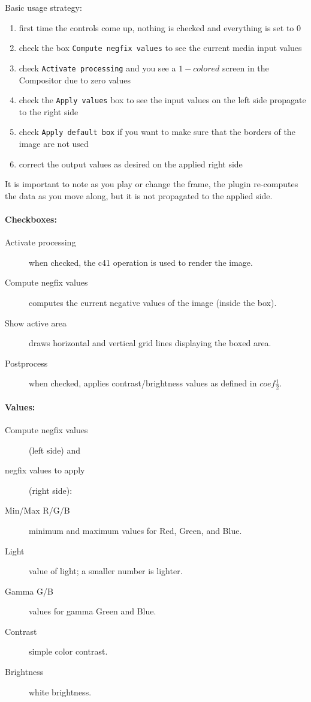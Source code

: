 Basic usage strategy:
\begin{enumerate}
    \item first time the controls come up, nothing is checked and everything is set to $0$
    \item check the box \texttt{Compute negfix values} to see the current media input values
    \item check \texttt{Activate processing} and you see a $1-colored$ screen in the Compositor due to zero values
    \item check the \texttt{Apply values} box to see the input values on the left side propagate to the right side
    \item check \texttt{Apply default box} if you want to make sure that the borders of the image are not used
    \item correct the output values as desired on the applied right side
\end{enumerate}

It is important to note as you play or change the frame, the plugin re-computes the data as you move along, but it is not propagated to the applied side.


\paragraph{Checkboxes:}
    \begin{description}
        \item[Activate processing] when checked, the c41 operation is used to render the image.
        \item[Compute negfix values] computes the current negative values of the image (inside the box).
        \item[Show active area] draws horizontal and vertical grid lines displaying the boxed area.
        \item[Postprocess] when checked, applies contrast/brightness values as defined in $coef\frac{1}{2}$.        
    \end{description}
\paragraph{Values:}
    \begin{description}
        \item[Compute negfix values] (left side) and
        \item[negfix values to apply] (right side):
        \item[Min/Max R/G/B] minimum and maximum values for Red, Green, and Blue.
        \item[Light] value of light; a smaller number is lighter.
        \item[Gamma G/B] values for gamma Green and Blue.
        \item[Contrast] simple color contrast.
        \item[Brightness] white brightness.
    \end{description}
